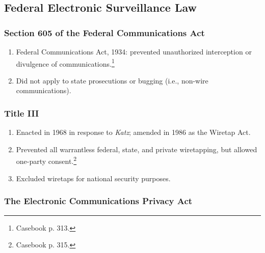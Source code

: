 \subsection{Federal Electronic Surveillance Law}

\subsubsection{Section 605 of the Federal Communications Act}

\begin{enumerate}
    \item Federal Communications Act, 1934: prevented unauthorized 
    interception or divulgence of communications.\footnote{Casebook p. 313.}
    \item Did not apply to state prosecutions or bugging (i.e., non-wire 
    communications).
\end{enumerate}

\subsubsection{Title III}

\begin{enumerate}
    \item Enacted in 1968 in response to \emph{Katz}; amended in 1986 as the 
    Wiretap Act.
    \item Prevented all warrantless federal, state, and private wiretapping, 
    but allowed one-party consent.\footnote{Casebook p. 315.}
    \item Excluded wiretaps for national security purposes.
\end{enumerate}

\subsubsection{The Electronic Communications Privacy Act}

